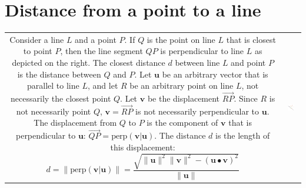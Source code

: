 \documentclass{article}
\begin{document}
\section*{Distance from a point to a line}

\begin{tabular}{cc}
\parbox{0.5\textwidth}{
Consider a line \(L\) and a point \(P\). If \(Q\) is the point on line \(L\) that is closest to point \(P\), then the line segment \(QP\) is perpendicular to line \(L\) as depicted on the right. The closest distance \(d\) between line \(L\) and point \(P\) is the distance between \(Q\) and \(P\). Let \(\mathbf{u}\) be an arbitrary vector that is parallel to line \(L\), and let \(R\) be an arbitrary point on line \(L\), not necessarily the closest point \(Q\). Let \(\mathbf{v}\) be the displacement \(\overrightarrow{RP}\). Since \(R\) is not necessarily point \(Q\), \(\mathbf{v} = \overrightarrow{RP}\) is not necessarily perpendicular to \(\mathbf{u}\). The displacement from \(Q\) to \(P\) is the component of \(\mathbf{v}\) that is perpendicular to \(\mathbf{u}\): \(\overrightarrow{QP} = \text{perp}(\mathbf{v}|\mathbf{u})\). The distance \(d\) is the length of this displacement:
\[d = \|\text{perp}(\mathbf{v}|\mathbf{u})\| = \frac{\sqrt{\|\mathbf{u}\|^2 \|\mathbf{v}\|^2 - (\mathbf{u} \bullet \mathbf{v})^2}}{\|\mathbf{u}\|}\] 
} & \parbox{0.5\textwidth}{
\includegraphics[width = 0.5\textwidth]{point_line_closest_distance}
}
\end{tabular}
\end{document}
